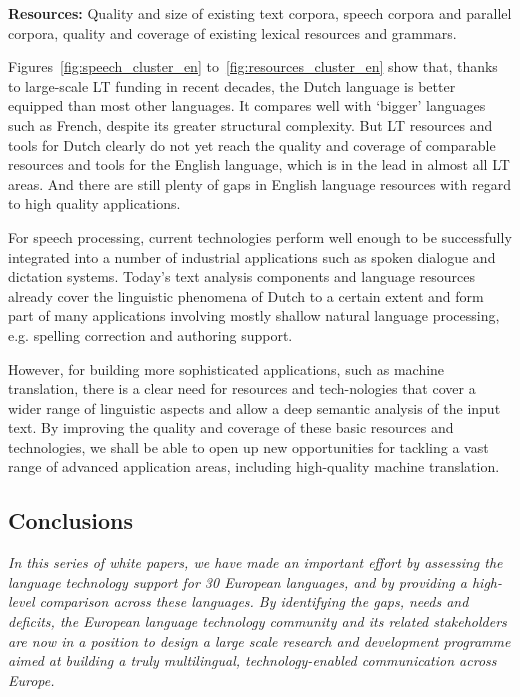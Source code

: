 \documentclass[]{../../metanetpaper}
\begin{document}
\begin{multicols}{2}
\textbf{Resources:} Quality and size of existing text corpora, speech corpora and parallel corpora, quality and coverage of existing lexical resources and grammars.

Figures~\ref{fig:speech_cluster_en} to~\ref{fig:resources_cluster_en} show that,  thanks to large-scale LT funding in recent decades, the Dutch language is better equipped than most other languages. It compares well with `bigger'  languages such as French, despite its greater structural complexity. But LT resources and tools for Dutch clearly do not yet reach the quality and coverage of comparable resources and tools for the English language, which is in the lead in almost all LT areas. And there are still plenty of gaps in English language resources with regard to high quality applications.

    For speech processing, current technologies perform well enough to be successfully integrated into a number of industrial applications such as spoken dialogue and dictation systems. Today's text analysis components and language resources already cover the linguistic phenomena of Dutch to a certain extent and form part of many applications involving mostly shallow natural language processing, e.g. spelling correction and authoring support.

    However, for building more sophisticated applications, such as machine translation, there is a clear need for resources and tech-nologies that cover a wider range of linguistic aspects and allow a deep semantic analysis of the input text. By improving the quality and coverage of these basic resources and technologies, we shall be able to open up new opportunities for tackling a vast range of advanced application areas, including high-quality machine translation.

\subsection{Conclusions}

\emph{In this series of white papers, we have made an important effort by assessing the language technology support for 30 European languages, and by providing a high-level comparison across these languages. By identifying the gaps, needs and deficits, the European language technology community and its related stakeholders are now in a position to design a large scale research and development programme aimed at building a truly multilingual, technology-enabled communication across Europe.}


\end{multicols}
\end{document}
